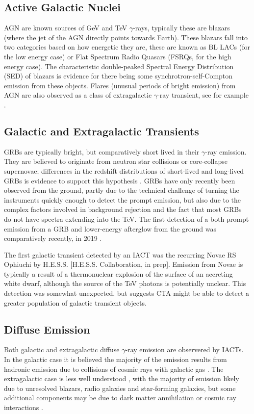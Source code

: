 \subsection{Active Galactic Nuclei}
AGN are known sources of GeV and TeV $\gamma$-rays, typically these are blazars (where the jet of the AGN directly points towards Earth). These blazars fall into two categories based on how energetic they are, these are known as BL LACs (for the low energy case) or Flat Spectrum Radio Quasars (FSRQs, for the high energy case). The characteristic double-peaked Spectral Energy Distribution (SED) of blazars is evidence for there being some synchrotron-self-Compton emission from these objects. Flares (unusual periods of bright emission) from AGN are also observed as a class of extragalactic $\gamma$-ray transient, see for example \cite{TXS}.

\subsection{Galactic and Extragalactic Transients}
GRBs are typically bright, but comparatively short lived in their $\gamma$-ray emission. They are believed to originate from neutron star collisions or core-collapse supernovae; differences in the redshift distributions of short-lived and long-lived GRBs is evidence to support this hypothesis \cite{longair}. GRBs have only recently been observed from the ground, partly due to the technical challenge of turning the instruments quickly enough to detect the prompt emission, but also due to the complex factors involved in background rejection and the fact that most GRBs do not have spectra extending into the TeV. The first detection of a both prompt emission from a GRB and lower-energy afterglow from the ground was comparatively recently, in 2019 \cite{magicGRB}.

The first galactic transient detected by an IACT was the recurring Novae RS Ophiuchi by H.E.S.S. [H.E.S.S. Collaboration, in prep]. Emission from Novae is typically a result of a thermonuclear explosion of the surface of an accreting white dwarf, although the source of the TeV photons is potentially unclear. This detection was somewhat unexpected, but suggests CTA might be able to detect a greater population of galactic transient objects.

\subsection{Diffuse Emission}
Both galactic and extragalactic diffuse $\gamma$-ray emission are observered by IACTs. In the galactic case it is believed the majority of the emission results from hadronic emission due to collisions of cosmic rays with galactic gas \cite{extragamma}. The extragalactic case is less well understood \cite{extragamma}, with the majority of emission likely due to unresolved blazars, radio galaxies and star-forming galaxies, but some additional components may be due to dark matter annihilation or cosmic ray interactions \cite{extragamma}.

